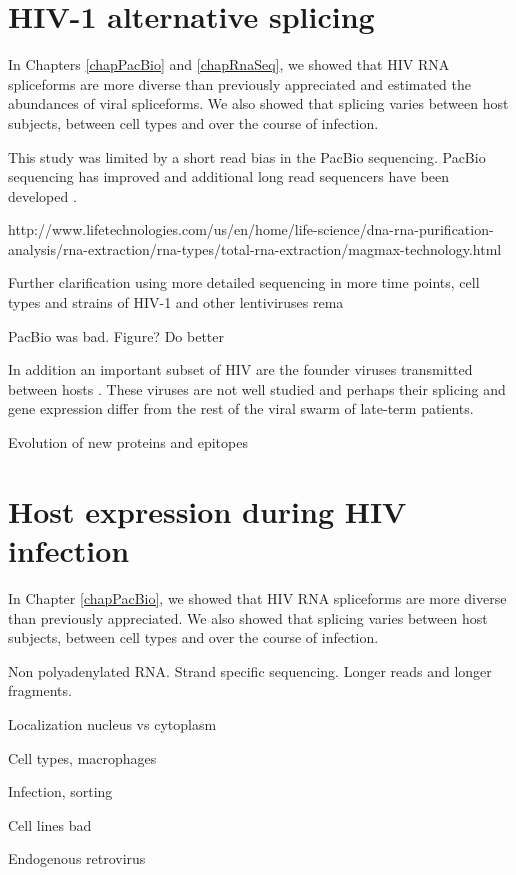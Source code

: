 \documentclass[../sherrill-Mix_thesis.tex]{subfiles}
\begin{document}
\section{HIV-1 alternative splicing}
In Chapters \ref{chapPacBio} and \ref{chapRnaSeq}, we showed that HIV RNA spliceforms are more diverse than previously appreciated and estimated the abundances of viral spliceforms. We also showed that splicing varies between host subjects, between cell types and over the course of infection.

This study was limited by a short read bias in the PacBio sequencing. PacBio sequencing has improved \citep{Mosher2014} and additional long read sequencers have been developed \citep{Mikheyev2014,Jain2015,Kilanski2015}.

http://www.lifetechnologies.com/us/en/home/life-science/dna-rna-purification-analysis/rna-extraction/rna-types/total-rna-extraction/magmax-technology.html


Further clarification using more detailed sequencing in more time points, cell types and strains of HIV-1 and other lentiviruses rema

PacBio was bad. Figure? Do better

In addition an important subset of HIV are the founder viruses transmitted between hosts \citep{Keele2008,Salazar-Gonzalez2009}. These viruses are not well studied and perhaps their splicing and gene expression differ from the rest of the viral swarm of late-term patients.

Evolution of new proteins and epitopes


\section{Host expression during HIV infection}

In Chapter \ref{chapPacBio}, we showed that HIV RNA spliceforms are more diverse than previously appreciated. We also showed that splicing varies between host subjects, between cell types and over the course of infection.



Non polyadenylated RNA. Strand specific sequencing. Longer reads and longer fragments.

Localization nucleus vs cytoplasm

Cell types, macrophages

Infection, sorting

Cell lines bad

Endogenous retrovirus
\end{document}
